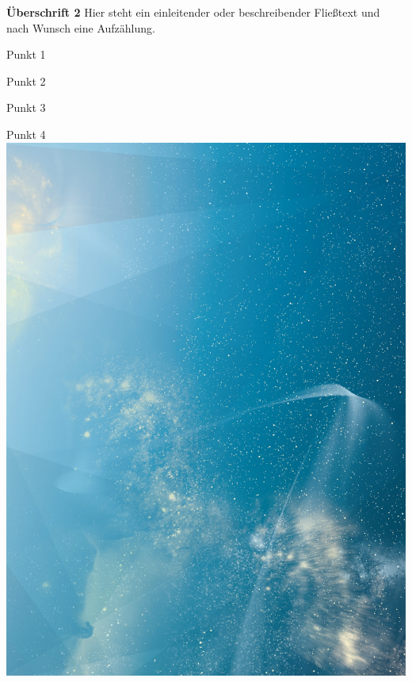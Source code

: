 \begin{frame}

\begin{multicols}{2}
    \textbf{Überschrift 2}\newline
    Hier steht ein einleitender oder beschreibender Fließtext und nach Wunsch
    eine Aufzählung.

    Punkt 1

    Punkt 2

    Punkt 3

    Punkt 4
    \vfill\columnbreak
    \includegraphics[width=\columnwidth, height=.7\textheight]{./Resources/Images/SternenhimmelHochkant.jpg}%
\end{multicols}
    
\end{frame}
\clearpage



